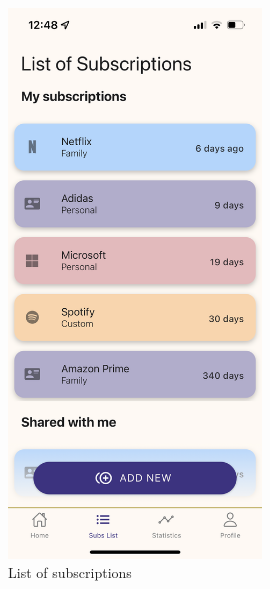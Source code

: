 \documentclass[12pt]{article}
\begin{document}
\begin{figure}[h!]
\begin{minipage}[c]{0.45\textwidth}
        \includegraphics[width=0.6\textwidth, clip]{../../assets/smartphone/subsList.PNG}
        \caption{List of subscriptions}
        \label{fig:subsList}
    \end{minipage}
\end{figure}
\end{document}
